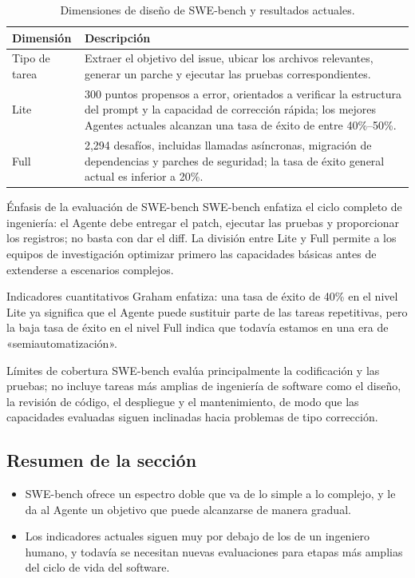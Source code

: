 \begin{table}[H]
\centering
\begin{tabular}{p{} p{}}
\toprule
Dimensión & Descripción \\
\midrule
Tipo de tarea & Extraer el objetivo del issue, ubicar los archivos relevantes, generar un parche y ejecutar las pruebas correspondientes. \\
\midrule
Lite & 300 puntos propensos a error, orientados a verificar la estructura del prompt y la capacidad de corrección rápida; los mejores Agentes actuales alcanzan una tasa de éxito de entre 40\%--50\%. \\
\midrule
Full & 2,294 desafíos, incluidas llamadas asíncronas, migración de dependencias y parches de seguridad; la tasa de éxito general actual es inferior a 20\%. \\
\bottomrule
\end{tabular}
\caption{Dimensiones de diseño de SWE-bench y resultados actuales.}
\end{table}

\begin{knowledgebox}{Énfasis de la evaluación de SWE-bench}
SWE-bench enfatiza el ciclo completo de ingeniería: el Agente debe entregar el patch, ejecutar las pruebas y proporcionar los registros; no basta con dar el diff. La división entre Lite y Full permite a los equipos de investigación optimizar primero las capacidades básicas antes de extenderse a escenarios complejos.
\end{knowledgebox}

\begin{importantbox}{Indicadores cuantitativos}
Graham enfatiza: una tasa de éxito de 40\% en el nivel Lite ya significa que el Agente puede sustituir parte de las tareas repetitivas, pero la baja tasa de éxito en el nivel Full indica que todavía estamos en una era de «semiautomatización».
\end{importantbox}

\begin{warningbox}{Límites de cobertura}
SWE-bench evalúa principalmente la codificación y las pruebas; no incluye tareas más amplias de ingeniería de software como el diseño, la revisión de código, el despliegue y el mantenimiento, de modo que las capacidades evaluadas siguen inclinadas hacia problemas de tipo corrección.
\end{warningbox}

\subsection{Resumen de la sección}
\begin{itemize}
    \item SWE-bench ofrece un espectro doble que va de lo simple a lo complejo, y le da al Agente un objetivo que puede alcanzarse de manera gradual.
    \item Los indicadores actuales siguen muy por debajo de los de un ingeniero humano, y todavía se necesitan nuevas evaluaciones para etapas más amplias del ciclo de vida del software.
\end{itemize}
